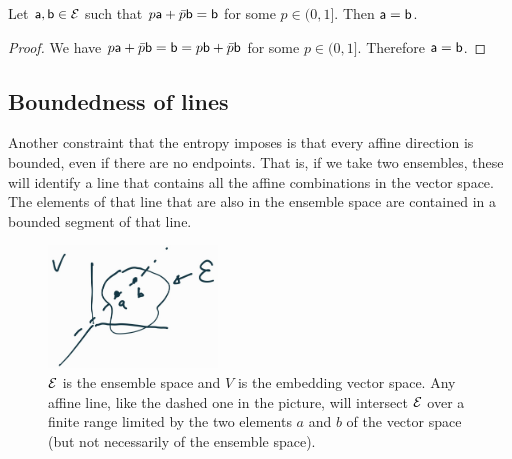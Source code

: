 \begin{mathSection}
	\begin{coro}
		Let $\ens[a], \ens[b] \in \Ens$ such that $p\ens[a] + \bar{p} \ens[b] = \ens[b]$ for some $p \in (0,1]$. Then $\ens[a] = \ens[b]$. 
	\end{coro}
	
	\begin{proof}
		We have $p\ens[a] + \bar{p} \ens[b] = \ens[b] = p\ens[b] + \bar{p} \ens[b]$ for some $p \in (0,1]$. Therefore $\ens[a] = \ens[b]$.
	\end{proof}
\end{mathSection}

\subsection{Boundedness of lines}

Another constraint that the entropy imposes is that every affine direction is bounded, even if there are no endpoints. That is, if we take two ensembles, these will identify a line that contains all the affine combinations in the vector space. The elements of that line that are also in the ensemble space are contained in a bounded segment of that line.

\begin{figure}[h]
	\centering
	\includegraphics[width=0.4\textwidth]{tempimages/BoundedEnsembleSpace.jpg}
	\caption{$\Ens$ is the ensemble space and $V$ is the embedding vector space. Any affine line, like the dashed one in the picture, will intersect $\Ens$ over a finite range limited by the two elements $a$ and $b$ of the vector space (but not necessarily of the ensemble space).}
\end{figure}


